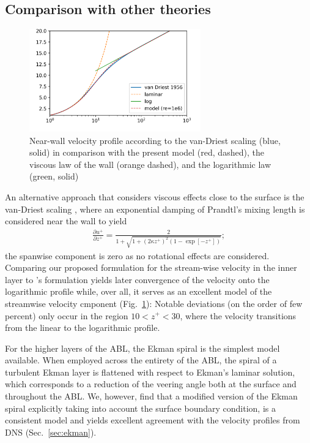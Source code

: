 \documentclass[smallcondensed,final]{svjour3}
\newcommand{\p}{\partial}
\begin{document}
\subsection{Comparison with other theories}
\begin{figure}
  \centerline{\includegraphics[width=0.66\textwidth]{../plot/vanDriest_profile.png}}
  \caption{Near-wall velocity profile according to the 
    van-Driest scaling (blue, solid) in comparison with 
    the present model (red, dashed), 
    the viscous law of the wall (orange dashed), and 
    the logarithmic law (green, solid)} 
  \label{fig:vanDriest}
\end{figure}  An alternative approach that considers viscous effects close to the surface is the van-Driest scaling \citep{vandriest:JOT1956}, 
where an exponential damping of Prandtl's mixing length is considered near the wall to yield 
\begin{align}
  \frac{\p u^+}{\p z^+} = \frac{2}{ 1+ \sqrt{1+\left(2\kappa z^+\right)^2 (1-\exp\left[-z^+\right])}};
\end{align}
the spanwise component is zero as no rotational effects are considered. 
%
Comparing our proposed formulation for the stream-wise velocity in the inner layer to  \citeauthor{vandriest:JOT1956}'s formulation yields later convergence of the velocity onto the logarithmic profile while, over all, it serves as an excellent model of the streamwise velocity cmponent (Fig.~\ref{fig:vanDriest}):
% 
Notable deviations (on the order of few percent) only occur in the region $10 < z^+ < 30$,  where the velocity transitions from the linear to the logarithmic profile. 
%
\par
%
For the higher layers of the ABL, the Ekman spiral is the simplest model available. 
%
When employed across the entirety of the ABL, the spiral of a turbulent Ekman layer is flattened with respect to Ekman's laminar solution, which  corresponds to a reduction of the veering angle both at the surface and throughout the ABL. 
%
We, however, find that a modified version of the Ekman spiral explicitly taking into account the surface boundary condition, is a consistent model and yields excellent agreement with the velocity profiles from DNS (Sec.~\ref{sec:ekman}). 
\end{document}

